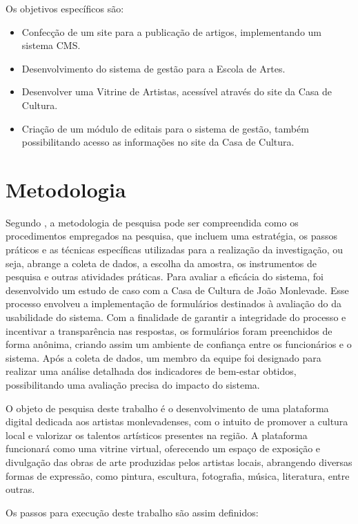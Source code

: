Os objetivos específicos são:

\begin{itemize}
	\item Confecção de um site para a publicação de artigos, implementando um sistema CMS.
	\item Desenvolvimento do sistema de gestão para a Escola de Artes.
	\item Desenvolver uma Vitrine de Artistas, acessível através do site da Casa de Cultura.
	\item Criação de um módulo de editais para o sistema de gestão, também possibilitando acesso as informações no site da Casa de Cultura.
\end{itemize}


\section{Metodologia}
\label{sec:metodologia}

Segundo \cite{moresi2003metodologia}, a metodologia de pesquisa pode ser compreendida como os procedimentos empregados na pesquisa, que incluem uma estratégia, os passos práticos e as técnicas específicas utilizadas para a realização da investigação, ou seja, abrange a coleta de dados, a escolha da amostra, os instrumentos de pesquisa e outras atividades práticas. Para avaliar a eficácia do sistema, foi desenvolvido um estudo de caso com a Casa de Cultura de João Monlevade. Esse processo envolveu a implementação de formulários destinados à avaliação do da usabilidade do sistema. Com a finalidade de garantir a integridade do processo e incentivar a transparência nas respostas, os formulários foram preenchidos de forma anônima, criando assim um ambiente de confiança entre os funcionários e o sistema. Após a coleta de dados, um membro da equipe foi designado para realizar uma análise detalhada dos indicadores de bem-estar obtidos, possibilitando uma avaliação precisa do impacto do sistema.

O objeto de pesquisa deste trabalho é o desenvolvimento de uma plataforma digital dedicada aos artistas monlevadenses, com o intuito de promover a cultura local e valorizar os talentos artísticos presentes na região. A plataforma funcionará como uma vitrine virtual, oferecendo um espaço de exposição e divulgação das obras de arte produzidas pelos artistas locais, abrangendo diversas formas de expressão, como pintura, escultura, fotografia, música, literatura, entre outras.

Os passos para execução deste trabalho são assim definidos:

